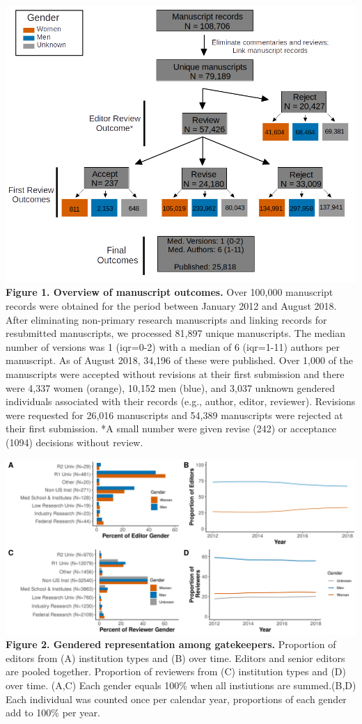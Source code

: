 \documentclass[11pt,]{article}
\begin{document}
\newpage

\includegraphics{population_diagram.png} \textbf{Figure 1. Overview of
manuscript outcomes.} Over 100,000 manuscript records were obtained for
the period between January 2012 and August 2018. After eliminating
non-primary research manuscripts and linking records for resubmitted
manuscripts, we processed 81,897 unique manuscripts. The median number
of versions was 1 (iqr=0-2) with a median of 6 (iqr=1-11) authors per
manuscript. As of August 2018, 34,196 of these were published. Over
1,000 of the manuscripts were accepted without revisions at their first
submission and there were 4,337 women (orange), 10,152 men (blue), and
3,037 unknown gendered individuals associated with their records (e.g.,
author, editor, reviewer). Revisions were requested for 26,016
manuscripts and 54,389 manuscripts were rejected at their first
submission. *A small number were given revise (242) or acceptance (1094)
decisions without review.

\newpage

\includegraphics{Figure_1.png} \textbf{Figure 2. Gendered representation
among gatekeepers.} Proportion of editors from (A) institution types and
(B) over time. Editors and senior editors are pooled together.
Proportion of reviewers from (C) institution types and (D) over time.
(A,C) Each gender equals 100\% when all instiutions are summed.(B,D)
Each individual was counted once per calendar year, proportions of each
gender add to 100\% per year.
\end{document}
